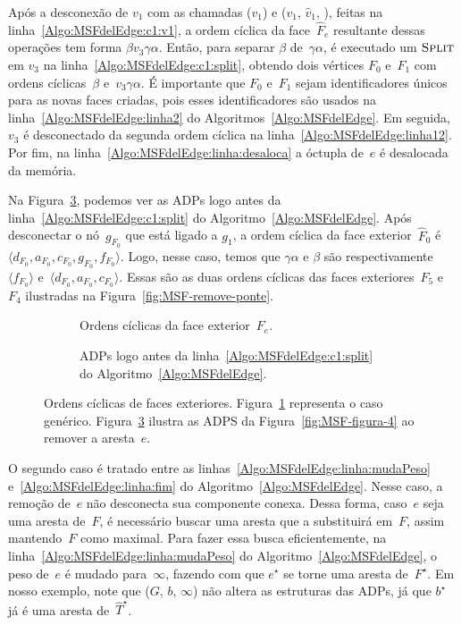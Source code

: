 Após a desconexão de $v_1$ com as chamadas \LCOCycle($v_1$) e \LCOSplit($v_1$, $\hat v_1$, \Nil), feitas na linha~\ref{Algo:MSFdelEdge:c1:v1}, a ordem cíclica da face~$\hat F_e$ resultante dessas operações tem forma $\beta v_3\gamma\alpha$.
Então, para separar $\beta$ de~$\gamma\alpha$, é executado um $\text{\scshape Split}$ em $v_3$ na linha~\ref{Algo:MSFdelEdge:c1:split}, obtendo dois vértices $F_0$ e~$F_1$ com ordens cíclicas~$\beta$ e~$v_3\gamma\alpha$.
É importante que $F_0$ e~$F_1$ sejam identificadores únicos para as novas faces criadas, pois esses identificadores são usados na linha~\ref{Algo:MSFdelEdge:linha2} do Algoritmos~\ref{Algo:MSFdelEdge}.
Em seguida, $v_3$ é desconectado da segunda ordem cíclica na linha~\ref{Algo:MSFdelEdge:linha12}.
Por fim, na linha~\ref{Algo:MSFdelEdge:linha:desaloca} a óctupla de~$e$ é desalocada da memória.

Na Figura~\ref{fig:MSF-ordem-ciclica-ponte-e}, podemos ver as ADPs logo antes da linha~\ref{Algo:MSFdelEdge:c1:split} do Algoritmo~\ref{Algo:MSFdelEdge}.
Após desconectar o nó~$g_{F_0}$ que está ligado a $g_1$, a ordem cíclica da face exterior~$\hat F_0$ é $\langle d_{F_0}, a_{F_0}, c_{F_0}, g_{F_0}, f_{F_0}\rangle$.
Logo, nesse caso, temos que $\gamma\alpha$ e $\beta$ são respectivamente $\langle f_{F_0} \rangle$ e~$\langle d_{F_0}, a_{F_0}, c_{F_0}\rangle$.
Essas são as duas ordens cíclicas das faces exteriores~$F_5$ e $F_4$ ilustradas na Figura~\ref{fig:MSF-remove-ponte}.

\begin{figure}[htb]
\begin{subfigure}{.4\textwidth}

\caption{Ordens cíclicas da face exterior~$F_e$.}
\label{fig:MSF-ordem-ciclica-ponte}
\end{subfigure}
\hfill
\begin{subfigure}{.4\textwidth}

\caption{ADPs logo antes da linha~\ref{Algo:MSFdelEdge:c1:split} do Algoritmo~\ref{Algo:MSFdelEdge}.}
\label{fig:MSF-ordem-ciclica-ponte-e}
\end{subfigure}
	\caption{Ordens cíclicas de faces exteriores. Figura~\ref{fig:MSF-ordem-ciclica-ponte} representa o caso genérico. Figura~\ref{fig:MSF-ordem-ciclica-ponte-e} ilustra as ADPS da Figura~\ref{fig:MSF-figura-4} ao remover a aresta~$e$.}
\end{figure}




O segundo caso é tratado entre as linhas~\ref{Algo:MSFdelEdge:linha:mudaPeso} e~\ref{Algo:MSFdelEdge:linha:fim} do Algoritmo~\ref{Algo:MSFdelEdge}.
Nesse caso, a remoção de~$e$ não desconecta sua componente conexa.
Dessa forma, caso~$e$ seja uma aresta de~$F$, é necessário buscar uma aresta que a substituirá em~$F$, assim mantendo~$F$ como maximal.
Para fazer essa busca eficientemente, na linha~\ref{Algo:MSFdelEdge:linha:mudaPeso} do Algoritmo~\ref{Algo:MSFdelEdge}, o peso de~$e$ é mudado para~$\infty$, fazendo com que $e^\star$ se torne uma aresta de~$F^\star$. 
Em nosso exemplo, note que \MSFupdate($G$, $b$, $\infty$) não altera as estruturas das ADPs, já que $b^\star$ já é uma aresta de~$\hat T^\star$.


